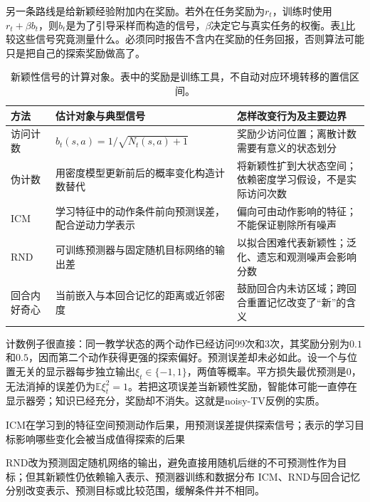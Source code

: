 另一条路线是给新颖经验附加内在奖励。若外在任务奖励为$r_t$，训练时使用$r_t+\beta b_t$，则$b_t$是为了引导采样而构造的信号，$\beta$决定它与真实任务的权衡。表\ref{tab:rl-learning-intrinsic}比较这些信号究竟测量什么。必须同时报告不含内在奖励的任务回报，否则算法可能只是把自己的探索奖励做高了。

\begin{table}[t]
  \centering
  \small
  \begin{tabularx}{\linewidth}{>{\raggedright\arraybackslash}p{24mm} >{\raggedright\arraybackslash}X >{\raggedright\arraybackslash}X}
    \toprule
    方法 & 估计对象与典型信号 & 怎样改变行为及主要边界 \\
    \midrule
    访问计数 & $b_t(s,a)=1/\sqrt{N_t(s,a)+1}$ & 奖励少访问位置；离散计数需要有意义的状态划分 \\
    伪计数 & 用密度模型更新前后的概率变化构造计数替代 & 将新颖性扩到大状态空间；依赖密度学习假设，不是实际访问次数 \\
    ICM & 学习特征中的动作条件前向预测误差，配合逆动力学表示 & 偏向可由动作影响的特征；不能保证剔除所有噪声 \\
    RND & 可训练预测器与固定随机目标网络的输出差 & 以拟合困难代表新颖性；泛化、遗忘和观测噪声会影响分数 \\
    回合内好奇心 & 当前嵌入与本回合记忆的距离或近邻密度 & 鼓励回合内未访区域；跨回合重置记忆改变了“新”的含义 \\
    \bottomrule
  \end{tabularx}
  \caption{新颖性信号的计算对象。表中的奖励是训练工具，不自动对应环境转移的置信区间。}
  \label{tab:rl-learning-intrinsic}
\end{table}

计数例子很直接：同一教学状态的两个动作已经访问99次和3次，其奖励分别为$0.1$和$0.5$，因而第二个动作获得更强的探索偏好。预测误差却未必如此。设一个与位置无关的显示器每步独立输出$\xi_t\in\{-1,1\}$，两值等概率。平方损失最优预测是0，无法消掉的误差仍为$\mathbb E\xi_t^2=1$。若把这项误差当新颖性奖励，智能体可能一直停在显示器旁；知识已经充分，奖励却不消失。这就是noisy-TV反例的实质。

ICM在学习到的特征空间预测动作后果，用预测误差提供探索信号；表示的学习目标影响哪些变化会被当成值得探索的后果

RND改为预测固定随机网络的输出，避免直接用随机后继的不可预测性作为目标；但其新颖性仍依赖输入表示、预测器训练和数据分布
ICM、RND与回合记忆分别改变表示、预测目标或比较范围，缓解条件并不相同。

